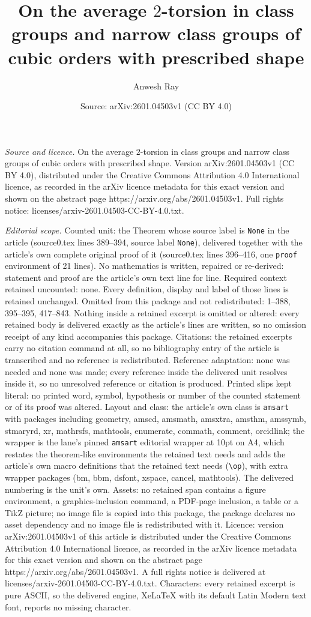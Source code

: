 \documentclass[10pt,a4paper]{amsart}
\title[On the average $2$-torsion in class groups and narrow class ]{On the average $2$-torsion in class groups and narrow class groups of cubic orders with prescribed shape}
\author{Anwesh Ray}
\date{Source: arXiv:2601.04503v1 (CC BY 4.0)}
\begin{document}
\maketitle

\noindent\emph{Source and licence.} On the average $2$-torsion in class groups and narrow class groups of cubic orders with prescribed shape. Version arXiv:2601.04503v1 (CC BY 4.0), distributed under the Creative Commons Attribution 4.0 International licence, as recorded in the arXiv licence metadata for this exact version and shown on the abstract page https://arxiv.org/abs/2601.04503v1. Full rights notice: licenses/arxiv-2601.04503-CC-BY-4.0.txt.\par\smallskip

\noindent\textit{Editorial scope.} Counted unit: the Theorem whose source label is \texttt{None} in the article (source0.tex lines 389--394, source label \texttt{None}), delivered together with the article's own complete original proof of it (source0.tex lines 396--416, one \texttt{proof} environment of 21 lines). No mathematics is written, repaired or re-derived: statement and proof are the article's own text line for line. Required context retained uncounted: none. Every definition, display and label of those lines is retained unchanged. Omitted from this package and not redistributed: 1--388, 395--395, 417--843. Nothing inside a retained excerpt is omitted or altered: every retained body is delivered exactly as the article's lines are written, so no omission receipt of any kind accompanies this package. Citations: the retained excerpts carry no citation command at all, so no bibliography entry of the article is transcribed and no reference is redistributed. Reference adaptation: none was needed and none was made; every reference inside the delivered unit resolves inside it, so no unresolved reference or citation is produced. Printed slips kept literal: no printed word, symbol, hypothesis or number of the counted statement or of its proof was altered. Layout and class: the article's own class is \texttt{amsart} with packages including geometry, amscd, amsmath, amsxtra, amsthm, amssymb, stmaryrd, xr, mathrsfs, mathtools, enumerate, commath, comment, orcidlink; the wrapper is the lane's pinned \texttt{amsart} editorial wrapper at 10pt on A4, which restates the theorem-like environments the retained text needs and adds the article's own macro definitions that the retained text needs (\texttt{\textbackslash op}), with extra wrapper packages (bm, bbm, dsfont, xspace, cancel, mathtools). The delivered numbering is the unit's own. Assets: no retained span contains a figure environment, a graphics-inclusion command, a PDF-page inclusion, a table or a TikZ picture; no image file is copied into this package, the package declares no asset dependency and no image file is redistributed with it. Licence: version arXiv:2601.04503v1 of this article is distributed under the Creative Commons Attribution 4.0 International licence, as recorded in the arXiv licence metadata for this exact version and shown on the abstract page https://arxiv.org/abs/2601.04503v1. A full rights notice is delivered at licenses/arxiv-2601.04503-CC-BY-4.0.txt. Characters: every retained excerpt is pure ASCII, so the delivered engine, XeLaTeX with its default Latin Modern text font, reports no missing character.
\end{document}
